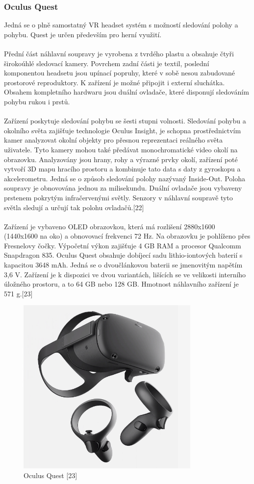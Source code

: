 \documentclass[a4paper, 12pt]{report}
\begin{document}
\subsubsection{Oculus Quest} Jedná se o plně samostatný VR headset systém s možností sledování polohy a pohybu. Quest je určen především pro herní využití.\\
\\
Přední část náhlavní soupravy je vyrobena z tvrdého plastu a obsahuje čtyři širokoúhlé sledovací kamery. Povrchem zadní části je textil, poslední komponentou headsetu jsou upínací popruhy, které v sobě nesou zabudované prostorové reproduktory. K zařízení je možné připojit i externí sluchátka. Obsahem kompletního hardwaru jsou duální ovladače, které disponují sledováním pohybu rukou i prstů.\\
\\
Zařízení poskytuje sledování pohybu se šesti stupni volnosti. Sledování pohybu a okolního světa zajišťuje technologie Oculus Insight, je schopna prostřednictvím kamer analyzovat okolní objekty pro přesnou reprezentaci reálného světa uživatele. Tyto kamery mohou také předávat monochromatické video okolí na obrazovku. Analyzovány jsou hrany, rohy a výrazné prvky okolí, zařízení poté vytvoří 3D mapu hracího prostoru a kombinuje tato data s daty z gyroskopu a akcelerometru. Jedná se o způsob sledování polohy nazývaný Inside-Out. Poloha soupravy je obnovována jednou za milisekundu. Duální ovladače jsou vybaveny prstenem pokrytým infračervenými světly. Senzory v náhlavní soupravě tyto světla sledují a určují tak polohu ovladačů.[22]\\
\\
Zařízení je vybaveno OLED obrazovkou, která má rozlišení 2880x1600 (1440x1600 na oko) a obnovovací frekvenci 72 Hz. Na obrazovku je pohlíženo přes Fresnelovy čočky. Výpočetní výkon zajišťuje 4 GB RAM a procesor Qualcomm Snapdragon 835. Oculus Quest obsahuje dobíjecí sadu lithio-iontových baterií s kapacitou 3648 mAh. Jedná se o dvoučlánkovou baterii se jmenovitým napětím 3,6 V. Zařízení je k dispozici ve dvou variantách, lišících se ve velikosti interního úložného prostoru, a to 64 GB nebo 128 GB. Hmotnost náhlavního zařízení je 571 g.[23]

\begin{figure}[h!]
	\centering
	\includegraphics[width=9cm]{oculus.jpg}
	\caption{Oculus Quest [23]}
\end{figure}
\end{document}
